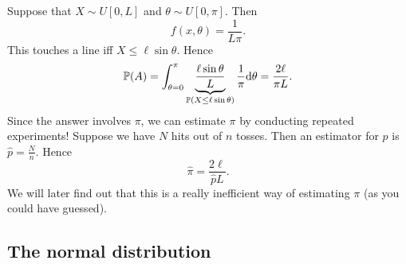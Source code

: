 \begin{note}
\begin{field}
\begin{eg}
\begin{center}
      \end{center}
      Suppose that $X\sim U[0, L]$ and $\theta\sim U[0, \pi]$. Then
      \[
        f(x, \theta) = \frac{1}{L\pi}.
      \]
      This touches a line iff $X \leq \ell \sin \theta$. Hence
      \[
        \mathbb{P}(A) = \int_{\theta = 0}^\pi \underbrace{\frac{\ell \sin \theta}{L}}_{\mathbb{P}(X \leq \ell\sin \theta)}\frac{1}{\pi}\mathrm{d} \theta = \frac{2\ell }{\pi L}.
      \]
      Since the answer involves $\pi$, we can estimate $\pi$ by conducting repeated experiments! Suppose we have $N$ hits out of $n$ tosses. Then an estimator for $p$ is $\hat{p} = \frac{N}{n}$. Hence
      \[
        \hat{\pi} = \frac{2\ell}{\hat{p}L}.
      \]
      We will later find out that this is a really inefficient way of estimating $\pi$ (as you could have guessed).
    \end{eg}
  \end{field}
  \xplain{}%
\end{note}

\subsection{The normal distribution}

